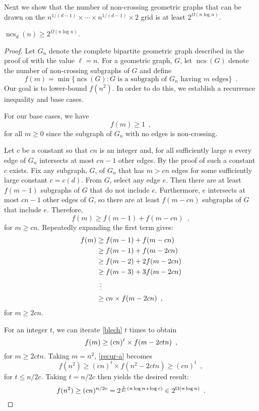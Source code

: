 \documentclass{patmorin}
\DeclareMathOperator{\ncs}{ncs}
\begin{document}
Next we show that the number of non-crossing geometric graphs that can
be drawn on the $n^{1/(d-1)}\times \cdots\times n^{1/(d-1)}\times 2$
grid is at least $2^{\Omega(n\log n)}$.

\begin{thm}
  $\ncs_d(n) \ge 2^{\Omega(n\log n)}$.
\end{thm}

\begin{proof}
Let $G_n$ denote the complete bipartite geometric graph described in
the proof of  with the value $\ell=n$.  For a
geometric graph, $G$, let $\ncs(G)$ denote the number of non-crossing
subgraphs of $G$ and define
\[
   f(m) = \min\{ \ncs(G) : \mbox{$G$ is a subgraph of $G_{n}$ having $m$ edges} \}
   \enspace . 
\]
Our goal is to lower-bound $f(n^2)$.  In order to do this, we establish
a recurrence inequality and base cases.

For our base cases, we have 
\[ 
   f(m)\ge 1 \enspace ,
\]
for all $m\ge 0$ since the subgraph of $G_{n}$ with no edges is
non-crossing.

Let $c$ be a constant so that $cn$ is an integer and, for all sufficiently
large $n$ every edge of $G_n$ intersects at most $cn-1$ other edges.
By the proof of  such a constant $c$ exists.
Fix any subgraph, $G$, of $G_{n}$ that has $m> cn$ edges for some
sufficiently large constant $c=c(d)$.  From $G$, select any edge $e$. Then
there are at least $f(m-1)$ subgraphs of $G$ that do not include $e$.
Furthermore, $e$ intersects at most $cn-1$ other edges of $G$, so there
are at least $f(m-cn)$ subgraphs of $G$ that include $e$.  Therefore,
\[  f(m) \ge f(m-1) + f(m-cn) \enspace ,
\]
for $m\ge cn$.  Repeatedly expanding the first term gives:
\begin{align}
f(m) & \ge  f(m-1) + f(m-cn) \notag \\
       & \ge  f(m-1) + f(m-2cn) \notag \\
       & \ge  f(m-2) + 2f(m-2cn) \notag \\
       & \ge  f(m-3) + 3f(m-2cn) \notag \\
       & \,\,\,\vdots  \notag \\
       & \ge  cn\times f(m-2cn) \enspace , \eqlabel{blech}
\end{align}
for $m\ge 2cn$.

For an integer $t$, we can iterate \eqref{blech} $t$ times to obtain
\begin{equation}
   f(m) \ge (cn)^t\times f(m-2ctn) \enspace ,
   \eqlabel{recur-a}
\end{equation} 
for $m\ge 2ctn$.  Taking $m=n^2$, \eqref{recur-a} becomes
\[
   f(n^2) \ge (cn)^t\times f(n^2-2ctn) \ge (cn)^t \enspace ,
\]
for $t \le n/2c$.  Taking $t=n/2c$ then yields the desired result:
\[
   f(n^2) \ge (cn)^{n/2c} = 2^{\frac{1}{2c}(n\log n+\log c)} \in 2^{\Omega(n\log n)} \enspace . \qedhere
\]
\end{proof}
\end{document}
